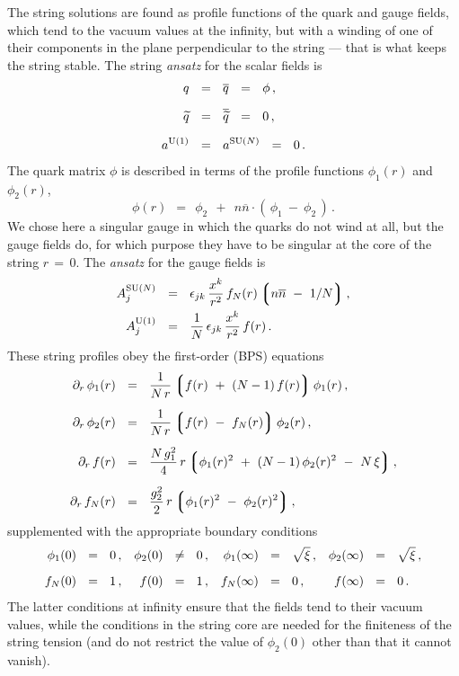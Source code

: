 \documentclass[12pt]{article}
\def\beq{\begin{equation}}
\def\eeq{\end{equation}}
\newcommand{\p}{\partial}
\newcommand{\wt}{\widetilde}
\newcommand{\ov}{\overline}
\newcommand{\lgr}{\left\lgroup}
\newcommand{\rgr}{\right\rgroup}
\newcommand{\aU}{a^{\rm U(1)}}
\newcommand{\aN}{a^\text{SU($N$)}}
\newcommand{\nnbar}{n\ov{n}}
\newcommand{\qt}{\wt{q}}
\newcommand{\bq}{\ov{q}}
\newcommand{\bqt}{\overline{\widetilde{q}}}
\newcommand{\ansatz}{{\it ansatz} }
\begin{document}
	The string solutions are found as profile functions of the quark and gauge fields, which tend
	to the vacuum values at the infinity, but with a winding of one of their components 
	in the plane perpendicular to the string --- that is what keeps the string stable.
	The string \ansatz for the scalar fields is
\begin{align}
%
\notag
	q    & ~~=~~    \bq    ~~=~~    \phi\,,    \\[2mm]
%
\label{qansatz}
	\qt    & ~~=~~    \bqt    ~~=~~    0\,,    \\[2mm]
%
\notag
	\aU    & ~~=~~    \aN    ~~=~~    0\,.
\end{align}
	The quark matrix $ \phi $ is described in terms of the profile functions $ \phi_1(r) $ and $ \phi_2(r) $,
\beq
	\phi(r)    ~~=~~    \phi_2  ~~+~~  \nnbar \cdot (\, \phi_1 ~-~ \phi_2 \,)\,.
\eeq
	We chose here a singular gauge in which the quarks do not wind at all, but the gauge fields do,
	for which purpose they have to be singular at the core of the string $ r \,=\, 0 $.
	The \ansatz for the gauge fields is
\begin{align}
%
\notag
	A_j^\text{SU($N$)}    & ~~=~~    \epsilon_{jk}\, \frac{x^k}{r^2}\, f_N(r) \lgr \nnbar ~-~ 1/N \rgr ,
	\\
%
\label{Aansatz}
	A_j^\text{U(1)}    & ~~=~~    \frac{1}{N}\, \epsilon_{jk}\, \frac{x^k}{r^2}\, f(r)\,.
\end{align}
	These string profiles obey the first-order (BPS) equations
\begin{align}
%
\notag
	\p_r\, \phi_1(r)    & ~~=~~    \frac{1}{N\,r} \lgr f(r) ~+~ (N - 1)\,f(r) \rgr \phi_1(r)\,,
	\\[2mm]
%
\notag
	\p_r\, \phi_2(r)    & ~~=~~    \frac{1}{N\,r} \lgr f(r) ~-~ f_N(r) \rgr \phi_2(r)\,,
	\\[2mm]
%
\label{BPS}
	\p_r\, f(r)    & ~~=~~    \frac{N\, g_1^2}{4}\, r \lgr \phi_1(r)^2  ~+~ (N-1)\,\phi_2(r)^2  ~-~  N\,\xi \rgr ,
	\\[2mm]
%
\notag
	\p_r\, f_N(r)    & ~~=~~    \frac{g_2^2}{2}\, r \lgr \phi_1(r)^2  ~-~  \phi_2(r)^2 \rgr ,
\end{align}
	supplemented with the appropriate boundary conditions
\begin{align}
%
\notag
	  \phi_1(0)    & ~~=~~    0\,,
	& \phi_2(0)    & ~~\neq~~    0\,,
	& \phi_1(\infty)    & ~~=~~ \sqrt{\xi}\,,
	& \phi_2(\infty)    & ~~=~~ \sqrt{\xi}\,,
	\\[2mm]
%
	f_N(0)    & ~~=~~ 1\,,
	& f(0)    & ~~=~~ 1\,,
	& f_N(\infty)    & ~~=~~ 0\,,
	& f(\infty)    & ~~=~~ 0\,.
\end{align}
	The latter conditions at infinity ensure that the fields tend to their vacuum values, while
	the conditions in the string core are needed for the finiteness of the string tension 
	(and do not restrict the value of $ \phi_2(0) $ other than that it cannot vanish).
\end{document}
